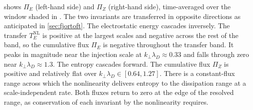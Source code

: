 \documentclass{jpp}
\newcommand{\kperp}{k_\perp}
\newcommand{\lambdaD}{\lambda_D}
\begin{document}
 shows $\Pi_E$ (left-hand side) and $\Pi_Z$ (right-hand side), time-averaged over the window shaded in . The two invariants are transferred in opposite directions as anticipated in \cref{sec:fjortoft}. The electrostatic energy cascades inversely. The transfer $T_E^\mathrm{NL}$ is positive at the largest scales and negative across the rest of the band, so the cumulative flux $\Pi_E$ is negative throughout the transfer band. It peaks in magnitude near the injection scale at $\kperp\lambdaD \approx 0.33$ and falls through zero near $\kperp\lambdaD \approx 1.3$. The entropy cascades forward. The cumulative flux $\Pi_Z$ is positive and relatively flat over $\kperp\lambdaD \in [0.64, 1.27]$. There is a constant-flux range across which the nonlinearity delivers entropy to the dissipation range at a scale-independent rate. Both fluxes return to zero at the edge of the resolved range, as conservation of each invariant by the nonlinearity requires.
\end{document}
